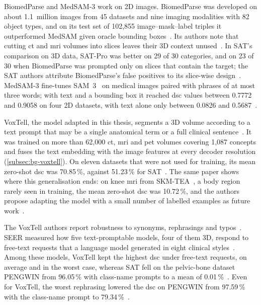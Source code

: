 BiomedParse and MedSAM-3 work on 2D images.
BiomedParse was developed on about 1.1~million images from 45 datasets and nine imaging modalities with 82 object types, and on its test set of 102{,}855 image--mask--label triples it outperformed MedSAM given oracle bounding boxes~\cite{zhao2025foundation-9de}.
Its authors note that cutting \gls{ct} and \gls{mri} volumes into slices leaves their 3D context unused~\cite{zhao2025foundation-9de}.
In SAT's comparison on 3D data, SAT-Pro was better on 29 of 30 categories, and on 23 of 30 when BiomedParse was prompted only on slices that contain the target; the SAT authors attribute BiomedParse's false positives to its slice-wise design~\cite{zhao2025sat}.
MedSAM-3 fine-tunes SAM~3~\cite{carion2026sam3segmentconcepts} on medical images paired with phrases of at most three words; with text and a bounding box it reached \gls{dsc} values between 0.7772 and 0.9058 on four 2D datasets, with text alone only between 0.0826 and 0.5687~\cite{liu2026medsam3delvingsegmentmedical}.

VoxTell, the model adapted in this thesis, segments a 3D volume according to a text prompt that may be a single anatomical term or a full clinical sentence~\cite{rokuss2025voxtellfreetextpromptableuniversal}.
It was trained on more than 62{,}000 \gls{ct}, \gls{mri} and \gls{pet} volumes covering 1{,}087 concepts and fuses the text embedding with the image features at every decoder resolution (\cref{subsec:bg-voxtell}).
On eleven datasets that were not used for training, its mean zero-shot \gls{dsc} was 70.85\,\%, against 51.23\,\% for SAT~\cite{rokuss2025voxtellfreetextpromptableuniversal}.
The same paper shows where this generalisation ends: on knee \gls{mri} from SKM-TEA~\cite{desai2021skmtea}, a body region rarely seen in training, the mean zero-shot \gls{dsc} was 10.72\,\%, and the authors propose adapting the model with a small number of labelled examples as future work~\cite{rokuss2025voxtellfreetextpromptableuniversal}.

The VoxTell authors report robustness to synonyms, rephrasings and typos~\cite{rokuss2025voxtellfreetextpromptableuniversal}.
SEER measured how five text-promptable models, four of them 3D, respond to free-text requests that a language model generated in eight clinical styles~\cite{zhang2026seer}.
Among these models, VoxTell kept the highest \gls{dsc} under free-text requests, on average and in the worst case, whereas SAT fell on the pelvic-bone dataset PENGWIN from 96.05\,\% with class-name prompts to a mean of 0.01\,\%~\cite{zhang2026seer}.
Even for VoxTell, the worst rephrasing lowered the \gls{dsc} on PENGWIN from 97.59\,\% with the class-name prompt to 79.34\,\%~\cite{zhang2026seer}.

